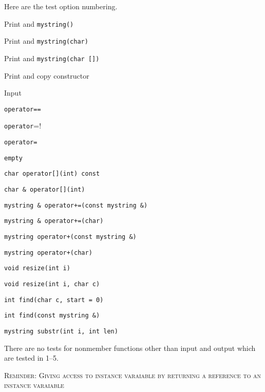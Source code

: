 
Here are the test option numbering.
\begin{tightlist}
    \item   Print and \verb!mystring()!
    \item   Print and \verb!mystring(char)!
    \item   Print and \verb!mystring(char [])!
    \item   Print and copy constructor
    \item   Input
    \item   \verb!operator==!
    \item   \verb!operator!=!
    \item   \verb!operator=!
    \item   \verb!empty!
    \item   \verb!char operator[](int) const!
    \item   \verb!char & operator[](int)!
    \item   \verb!mystring & operator+=(const mystring &)!
    \item   \verb!mystring & operator+=(char)!
    \item   \verb!mystring operator+(const mystring &)!
    \item   \verb!mystring operator+(char)!
    \item   \verb!void resize(int i)!
    \item   \verb!void resize(int i, char c)!
    \item   \verb!int find(char c, start = 0)!
    \item   \verb!int find(const mystring &)!
    \item   \verb!mystring substr(int i, int len)!
\end{tightlist}
There are no tests for nonmember functions other than input and output
which are tested in 1--5.





\newpage
\textsc{Reminder: Giving access to instance varaiable by returning a reference to an instance varaiable}

